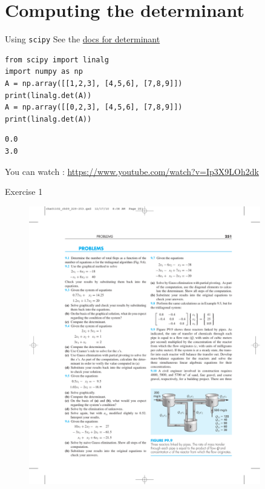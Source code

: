 \documentclass[xcolor=svgnames,t,10pt,allowframebreaks]{beamer}
\begin{document}
\begin{frame}[standout,label=]{}
\end{frame}
\section{Computing the determinant}
\label{sec:org7ba0c82}
\begin{frame}[fragile,label={sec:org60dad40}]{Using \texttt{scipy}}
 See the \href{https://docs.scipy.org/doc/scipy/reference/generated/scipy.linalg.det.html\#scipy.linalg.det}{docs for determinant}
\pause
\begin{verbatim}
from scipy import linalg
import numpy as np
A = np.array([[1,2,3], [4,5,6], [7,8,9]])
print(linalg.det(A))
A = np.array([[0,2,3], [4,5,6], [7,8,9]])
print(linalg.det(A))
\end{verbatim}
\pause

\begin{verbatim}
0.0
3.0
\end{verbatim}

You can watch : \url{https://www.youtube.com/watch?v=Ip3X9LOh2dk}
\end{frame}
\begin{frame}[label={sec:org7a1bb2d}]{Exercise 1}
\begin{figure}[H]

\includegraphics[width=0.9\textwidth]{fig/det-01.pdf}
\end{figure}
\end{frame}
\end{document}
